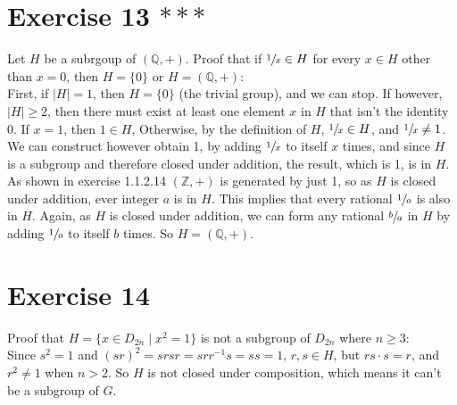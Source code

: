 \documentclass{article}
\newcommand{\Z}{\mathbb{Z}}
\newcommand{\Q}{\mathbb{Q}}
\begin{document}
    \section*{Exercise 13 $***$}
    Let $H$ be a subrgoup of $(\Q, +)$.
    Proof that if $\sfrac{1}{x} \in H$ for every $x \in H$ other than $x = 0$,
    then $H = \{0\}$ or $H = (\Q, +)$: \\
    First, if $|H| = 1$, then $H = \{0\}$ (the trivial group),
    and we can stop.
    If however, $|H| \geqslant 2$,
    then there must exist at least one element $x$ in $H$ that isn't the
    identity 0.
    If $x = 1$, then $1 \in H$,
    Otherwise, by the definition of $H$, $\sfrac{1}{x} \in H$,
    and $\sfrac{1}{x} \neq 1$.
    We can construct however obtain 1,
    by adding $\sfrac{1}{x}$ to itself $x$ times,
    and since $H$ is a subgroup and therefore closed under addition,
    the result, which is 1, is in $H$.
    As shown in exercise 1.1.2.14 $(\Z, +)$ is generated by just 1,
    so as $H$ is closed under addition,
    ever integer $a$ is in $H$.
    This implies that every rational $\sfrac{1}{a}$ is also in $H$.
    Again, as $H$ is closed under addition,
    we can form any rational $\sfrac{b}{a}$ in $H$
    by adding $\sfrac{1}{a}$ to itself $b$ times.
    So $H = (\Q, +)$.


    \section*{Exercise 14}
    Proof that $H = \{x \in D_{2n} \mid x^2 = 1\}$
    is not a subgroup of $D_{2n}$ where $n \geqslant 3$: \\
    Since $s^2 = 1$ and $(sr)^2 = srsr = srr^{-1}s = ss = 1$,
    $r, s \in H$,
    but $rs \cdot s = r$, and $r^2 \neq 1$ when $n > 2$.
    So $H$ is not closed under composition,
    which means it can't be a subgroup of $G$.
\end{document}
